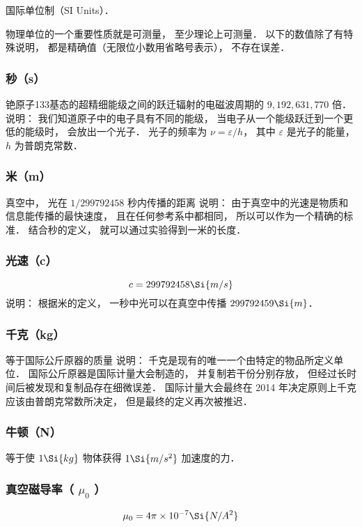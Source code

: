 
国际单位制（SI Units）．

物理单位的一个重要性质就是可测量， 至少理论上可测量． 以下的数值除了有特殊说明， 都是精确值（无限位小数用省略号表示）， 不存在误差．

\subsubsection{秒（s）}
铯原子133基态的超精细能级之间的跃迁辐射的电磁波周期的 $9, 192, 631, 770$ 倍． 
说明： 我们知道原子中的电子具有不同的能级， 当电子从一个能级跃迁到一个更低的能级时， 会放出一个光子． 光子的频率为 $\nu  = \varepsilon /h$，   其中 $\varepsilon $ 是光子的能量， $h$ 为普朗克常数．

\subsubsection{米（m）}
真空中， 光在 $1/299792458$ 秒内传播的距离
说明： 由于真空中的光速是物质和信息能传播的最快速度， 且在任何参考系中都相同， 所以可以作为一个精确的标准． 结合秒的定义， 就可以通过实验得到一米的长度．

\subsubsection{光速（c）}
 \begin{equation}
c = 299792458 \Si{m/s}
\end{equation} 
说明： 根据米的定义， 一秒中光可以在真空中传播 $299792459 \Si{m}$．  

\subsubsection{千克（kg）}
等于国际公斤原器的质量
说明： 千克是现有的唯一一个由特定的物品所定义单位． 国际公斤原器是国际计量大会制造的， 并复制若干份分别存放， 但经过长时间后被发现和复制品存在细微误差． 国际计量大会最终在 2014 年决定原则上千克应该由普朗克常数所决定， 但是最终的定义再次被推迟．

\subsubsection{牛顿（N）}
等于使 $1\Si{kg}$ 物体获得 $1\Si{m/s^2}$ 加速度的力．

\subsubsection{真空磁导率（ $\mu_0$ ）}
\begin{equation}
\mu_0 = 4\pi \times 10^{-7} \Si{N/A^2}
\end{equation}

